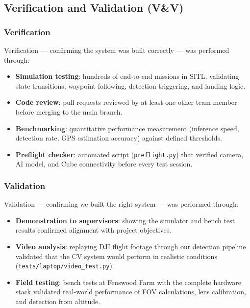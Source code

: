 \subsection{Verification and Validation (V\&V)}

\subsubsection{Verification}

Verification --- confirming the system was built correctly --- was performed through:

\begin{itemize}
  \item \textbf{Simulation testing}: hundreds of end-to-end missions in SITL, validating state transitions, waypoint following, detection triggering, and landing logic.
  \item \textbf{Code review}: pull requests reviewed by at least one other team member before merging to the main branch.
  \item \textbf{Benchmarking}: quantitative performance measurement (inference speed, detection rate, GPS estimation accuracy) against defined thresholds.
  \item \textbf{Preflight checker}: automated script (\texttt{preflight.py}) that verified camera, AI model, and Cube connectivity before every test session.
\end{itemize}

\subsubsection{Validation}

Validation --- confirming we built the right system --- was performed through:

\begin{itemize}
  \item \textbf{Demonstration to supervisors}: showing the simulator and bench test results confirmed alignment with project objectives.
  \item \textbf{Video analysis}: replaying DJI flight footage through our detection pipeline validated that the CV system would perform in realistic conditions (\texttt{tests/laptop/video\_test.py}).
  \item \textbf{Field testing}: bench tests at Fenswood Farm with the complete hardware stack validated real-world performance of FOV calculations, lens calibration, and detection from altitude.
\end{itemize}

